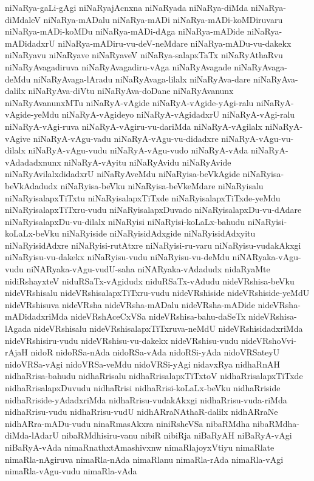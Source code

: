 {niNaRya-gaLi-gAgi
niNaRyajAcnxna
niNaRyada
niNaRya-diMda
niNaRya-diMdaleV
niNaRya-mADalu
niNaRya-mADi
niNaRya-mADi-koMDiruvaru
niNaRya-mADi-koMDu
niNaRya-mADi-dAga
niNaRya-mADide
niNaRya-mADidadxrU
niNaRya-mADiru-vu-deV-neMdare
niNaRya-mADu-vu-dakekx
niNaRyavu
niNaRyave
niNaRyaveV
niNaRya-salapxTaTx
niNaRyAthaRvu
niNaRyAvagadiruva
niNaRyAvagadiru-vAga
niNaRyAvagade
niNaRyAvaga-deMdu
niNaRyAvaga-lAradu
niNaRyAvaga-lilalx
niNaRyAva-dare
niNaRyAva-dalilx
niNaRyAva-diVtu
niNaRyAva-doDane
niNaRyAvanunx
niNaRyAvanunxMTu
niNaRyA-vAgide
niNaRyA-vAgide-yAgi-ralu
niNaRyA-vAgide-yeMdu
niNaRyA-vAgideyo
niNaRyA-vAgidadxrU
niNaRyA-vAgi-ralu
niNaRyA-vAgi-ruva
niNaRyA-vAgiru-vu-dariMda
niNaRyA-vAgilalx
niNaRyA-vAgive
niNaRyA-vAgu-vadu
niNaRyA-vAgu-vu-didadxre
niNaRyA-vAgu-vu-dilalx
niNaRyA-vAgu-vudu
niNaRyA-vAgu-vudo
niNaRyA-vAda
niNaRyA-vAdadadxnunx
niNaRyA-vAyitu
niNaRyAvidu
niNaRyAvide
niNaRyAvilalxdidadxrU
niNaRyAveMdu
niNaRyisa-beVkAgide
niNaRyisa-beVkAdadudx
niNaRyisa-beVku
niNaRyisa-beVkeMdare
niNaRyisalu
niNaRyisalapxTiTxtu
niNaRyisalapxTiTxde
niNaRyisalapxTiTxde-yeMdu
niNaRyisalapxTiTxru-vudu
niNaRyisalapxDuvado
niNaRyisalapxDu-vu-dAdare
niNaRyisalapxDu-vu-dilalx
niNaRyisi
niNaRyisi-koLaLx-bahudu
niNaRyisi-koLaLx-beVku
niNaRyiside
niNaRyisidAdxgide
niNaRyisidAdxyitu
niNaRyisidAdxre
niNaRyisi-rutAtxre
niNaRyisi-ru-varu
niNaRyisu-vudakAkxgi
niNaRyisu-vu-dakekx
niNaRyisu-vudu
niNaRyisu-vu-deMdu
niNARyaka-vAgu-vudu
niNARyaka-vAgu-vudU-saha
niNARyaka-vAdadudx
nidaRyaMte
nidiRshayxteV
niduRSaTx-vAgidudx
niduRSaTx-vAdudu
nideVRshisa-beVku
nideVRshisalu
nideVRshisalapxTiTxru-vudu
nideVRshiside
nideVRshiside-yeMdU
nideVRshisuva
nideVRsha
nideVRsha-mADalu
nideVRsha-mADide
nideVRsha-mADidadxriMda
nideVRshAceCxVSa
nideVRshisa-bahu-daSeTx
nideVRshisa-lAgada
nideVRshisalu
nideVRshisalapxTiTxruva-neMdU
nideVRshisidadxriMda
nideVRshisiru-vudu
nideVRshisu-vu-dakekx
nideVRshisu-vudu
nideVRshoVvi-rAjaH
nidoR
nidoRSa-nAda
nidoRSa-vAda
nidoRSi-yAda
nidoVRSateyU
nidoVRSa-vAgi
nidoVRSa-veMdu
nidoVRSi-yAgi
nidavxRya
nidhaRnAH
nidhaRrisa-bahudu
nidhaRrisalu
nidhaRrisalapxTiTxtoV
nidhaRrisalapxTiTxde
nidhaRrisalapxDuvudu
nidhaRrisi
nidhaRrisi-koLaLx-beVku
nidhaRriside
nidhaRriside-yAdadxriMda
nidhaRrisu-vudakAkxgi
nidhaRrisu-vuda-riMda
nidhaRrisu-vudu
nidhaRrisu-vudU
nidhARraNAthaR-dalilx
nidhARraNe
nidhARra-mADu-vudu
ninaRmasAkxra
niniRsheVSa
nibaRMdha
nibaRMdha-diMda-lAdarU
nibaRMdhisiru-vanu
nibiR
nibiRja
niBaRyAH
niBaRyA-vAgi
niBaRyA-vAda
nimaRnathxtAmashivxnw
nimaRlajoyxVtiyu
nimaRlate
nimaRla-nAgiruva
nimaRla-nAda
nimaRlanu
nimaRla-rAda
nimaRla-vAgi
nimaRla-vAgu-vudu
nimaRla-vAda
}
